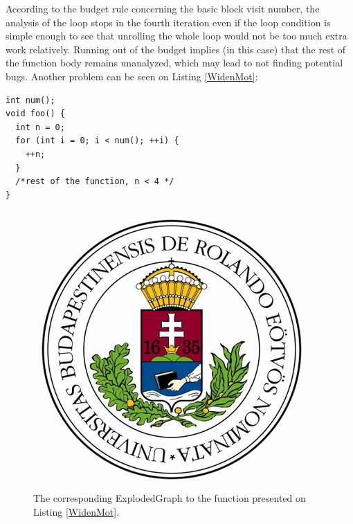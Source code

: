 According to the budget rule concerning the basic block visit number, the
analysis of the loop stops in the fourth iteration even if the loop 
condition is simple enough to see that unrolling the whole loop would not be 
too much extra work relatively. Running out of the budget implies (in this 
case) that the rest of the function body remains unanalyzed, which may lead to 
not finding potential bugs.
Another problem can be seen on Listing \ref{WidenMot}:
\begin{lstlisting}
int num();
void foo() {
  int n = 0;
  for (int i = 0; i < num(); ++i) {
    ++n;
  }
  /*rest of the function, n < 4 */
}\end{lstlisting}

\begin{figure}[h]
	\centering
	\includegraphics[scale=0.3]{img/elte-cimer}
	\caption{The corresponding ExplodedGraph to the function presented on 
	Listing \ref{WidenMot}.}
	\label{fig:eg_mot_1}
\end{figure}

